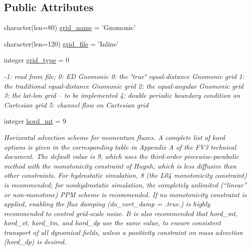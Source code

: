 \subsection*{Public Attributes}
\begin{DoxyCompactItemize}
\item 
character(len=80) \hyperlink{structfv__arrays__mod_1_1fv__flags__type_a3db69164bedf77520133bab7a563ad64}{grid\-\_\-name} = 'Gnomonic'
\item 
character(len=120) \hyperlink{structfv__arrays__mod_1_1fv__flags__type_a5ae6853512fe75e5f08388470d4f0da6}{grid\-\_\-file} = 'Inline'
\item 
integer \hyperlink{structfv__arrays__mod_1_1fv__flags__type_aee15326da7e817a68d9591e7dca01325}{grid\-\_\-type} = 0
\begin{DoxyCompactList}\small\item\em -\/1\-: read from file; 0\-: E\-D Gnomonic 0\-: the \char`\"{}true\char`\"{} equal-\/distance Gnomonic grid 1\-: the traditional equal-\/distance Gnomonic grid 2\-: the equal-\/angular Gnomonic grid 3\-: the lat-\/lon grid -- to be implemented 4\-: double periodic boundary condition on Cartesian grid 5\-: channel flow on Cartesian grid \end{DoxyCompactList}\item 
integer \hyperlink{structfv__arrays__mod_1_1fv__flags__type_ab166cc8b6c93e0c863180aeb50b5aea9}{hord\-\_\-mt} = 9
\begin{DoxyCompactList}\small\item\em Horizontal advection scheme for momentum fluxes. A complete list of kord options is given in the corresponding table in Appendix A of the F\-V3 technical document. The default value is 9, which uses the third-\/order piecewise-\/parabolic method with the monotonicity constraint of Huynh, which is less diffusive than other constraints. For hydrostatic simulation, 8 (the L04 monotonicity constraint) is recommended; for nonhydrostatic simulation, the completely unlimited (“linear” or non-\/monotone) P\-P\-M scheme is recommended. If no monotonicity constraint is applied, enabling the flux damping (do\-\_\-vort\-\_\-damp = .true.) is highly recommended to control grid-\/scale noise. It is also recommended that hord\-\_\-mt, hord\-\_\-vt, hord\-\_\-tm, and hord\-\_\-dp use the same value, to ensure consistent transport of all dynamical fields, unless a positivity constraint on mass advection (hord\-\_\-dp) is desired. \end{DoxyCompactList}\item 

\end{DoxyCompactItemize}
